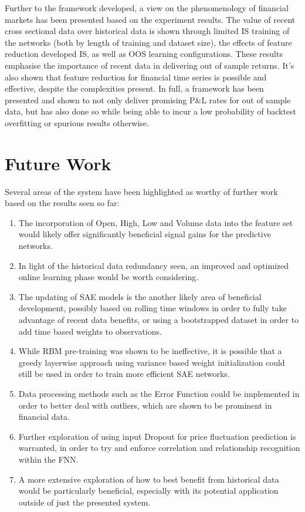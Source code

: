 \documentclass[a4paper,11pt,oneside]{article}
\theoremstyle{plain}
\theoremstyle{definition}
\begin{document}
	Further to the framework developed, a view on the phenomenology of financial markets has been presented based on the experiment results. The value of recent cross sectional data over historical data is shown through limited IS training of the networks (both by length of training and dataset size), the effects of feature reduction developed IS, as well as OOS learning configurations. These results emphasise the importance of recent data in delivering out of sample returns. It's also shown that feature reduction for financial time series is possible and effective, despite the complexities present. In full, a framework has been presented and shown to not only deliver promising P\&L rates for out of sample data, but has also done so while being able to incur a low probability of backtest overfitting or spurious results otherwise.
	
	\newpage
	\section{Future Work}
	
	Several areas of the system have been highlighted as worthy of further work based on the results seen so far: 
	\begin{enumerate}
		\item The incorporation of Open, High, Low and Volume data into the feature set would likely offer significantly beneficial signal gains for the predictive networks.
		\item In light of the historical data redundancy seen, an improved and optimized online learning phase would be worth considering.
		\item The updating of SAE models is the another likely area of beneficial development, possibly based on rolling time windows in order to fully take advantage of recent data benefits, or using a bootstrapped dataset in order to add time based weights to observations.
		\item While RBM pre-training was shown to be ineffective, it is possible that a greedy layerwise approach using variance based weight initialization could still be used in order to train more efficient SAE networks.
		\item Data processing methods such as the Error Function could be implemented in order to better deal with outliers, which are shown to be prominent in financial data.
		\item Further exploration of using input Dropout for price fluctuation prediction is warranted, in order to try and enforce correlation and relationship recognition within the FNN.
		\item A more extensive exploration of how to best benefit from historical data would be particularly beneficial, especially with its potential application outside of just the presented system.
	\end{enumerate}
	
\end{document}
